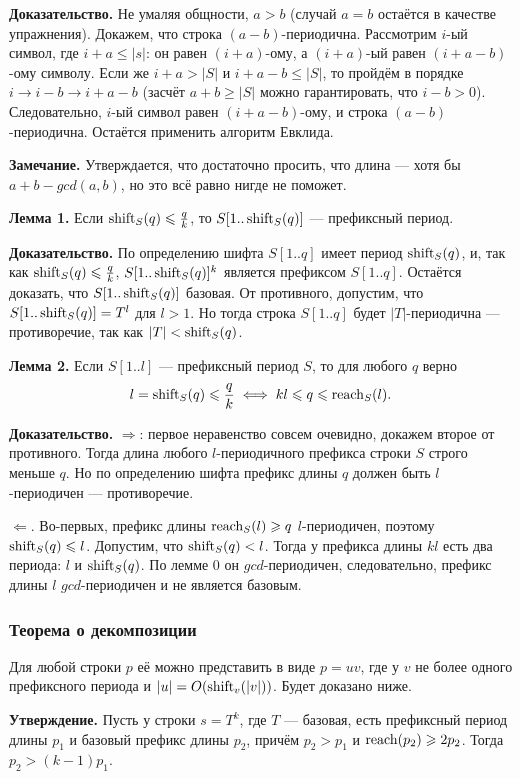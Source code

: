 \textbf{Доказательство.} Не умаляя общности, $a > b$ (случай $a = b$ остаётся в качестве упражнения).
Докажем, что строка $(a - b)$-периодична.
Рассмотрим $i$-ый символ, где $i + a \le |s|$: он равен $(i + a)$-ому, а $(i + a)$-ый равен $(i + a - b)$-ому символу.
Если же $i + a > |S|$ и $i + a - b \le |S|$, то пройдём в порядке $i \to i - b \to i + a - b$ (засчёт $a + b \ge |S|$ можно гарантировать, что $i - b > 0$).
Следовательно, $i$-ый символ равен $(i + a - b)$-ому, и строка $(a - b)$-периодична.
Остаётся применить алгоритм Евклида.

\textbf{Замечание.} Утверждается, что достаточно просить, что длина --- хотя бы $a + b - gcd(a, b)$, но это всё равно нигде не поможет.

\textbf{Лемма 1.} Если $\operatorname{shift}_S(q) \leqslant \frac{q}{k}$, то $S[1..\operatorname{shift}_S(q)]$ --- префиксный период.

\textbf{Доказательство.} По определению шифта $S[1..q]$ имеет период $\operatorname{shift}_S(q)$, и, так как $\operatorname{shift}_S(q) \leqslant \frac{q}{k}$, $S[1..\operatorname{shift}_S(q)]^k$ является префиксом $S[1..q]$.
Остаётся доказать, что $S[1..\operatorname{shift}_S(q)]$ базовая.
От противного, допустим, что $S[1..\operatorname{shift}_S(q)] = T^l$ для $l > 1$.
Но тогда строка $S[1..q]$ будет $|T|$-периодична --- противоречие, так как $|T| < \operatorname{shift}_S(q)$.

\textbf{Лемма 2.} Если $S[1..l]$ --- префиксный период $S$, то для любого $q$ верно
\[
    l = \operatorname{shift}_S(q) \leqslant \frac{q}{k} \iff kl \leqslant q \leqslant \operatorname{reach}_S(l).
\]

\textbf{Доказательство.} $\Rightarrow$: первое неравенство совсем очевидно, докажем второе от противного.
Тогда длина любого $l$-периодичного префикса строки $S$ строго меньше $q$.
Но по определению шифта префикс длины $q$ должен быть $l$-периодичен --- противоречие.

$\Leftarrow$. Во-первых, префикс длины $\operatorname{reach}_S(l) \geqslant q$ $l$-периодичен, поэтому $\operatorname{shift}_S(q) \leqslant l$.
Допустим, что $\operatorname{shift}_S(q) < l$. Тогда у префикса длины $kl$ есть два периода: $l$ и $\operatorname{shift}_S(q)$.
По лемме 0 он $gcd$-периодичен, следовательно, префикс длины $l$ $gcd$-периодичен и не является базовым.

\subsubsection{Теорема о декомпозиции}
Для любой строки $p$ её можно представить в виде $p = uv$, где у $v$ не более одного префиксного периода и $|u| = O(\operatorname{shift}_v(|v|))$.
Будет доказано ниже.

\textbf{Утверждение.} Пусть у строки $s = T^k$, где $T$ --- базовая, есть префиксный период длины $p_1$ и базовый префикс длины $p_2$, причём $p_2 > p_1$ и $\operatorname{reach}(p_2) \geqslant 2p_2$.
Тогда $p_2 > (k-1)p_1$.

